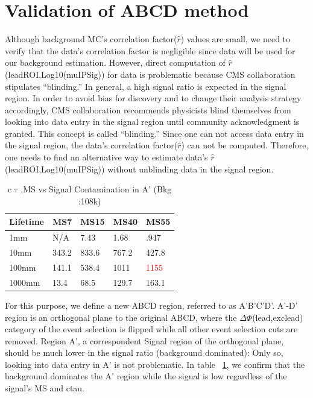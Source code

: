 \section{Validation of ABCD method}
Although background MC's correlation factor($\hat{r}$) values are small, we need to verify that the data's correlation factor is negligible since data will be used for our background estimation.
However, direct computation of $\hat{r}$(leadROI,Log10(muIPSig)) for data is problematic because CMS collaboration stipulates ``blinding.''
In general, a high signal ratio is expected in the signal region.
In order to avoid bias for discovery and to change their analysis strategy accordingly, CMS collaboration recommends physicists blind themselves from looking into data entry in the signal region until community acknowledgment is granted.
This concept is called ``blinding.''
Since one can not access data entry in the signal region, the data's correlation factor($\hat{r}$) can not be computed.
Therefore, one needs to find an alternative way to estimate data's $\hat{r}$(leadROI,Log10(muIPSig)) without unblinding data in the signal region.

\begin{table}[htb]
\centering
\begin{tabular}{|p{3cm}|p{1cm}|p{1cm}|p{1cm}|p{1cm}|}
\hline
Lifetime & MS7 & MS15&MS40&MS55 \\
\hline
1mm & N/A & 7.43 & 1.68 & .947   \\
\hline
10mm & 343.2 & 833.6 & 767.2 & 427.8  \\
\hline
100mm & 141.1& 538.4 & 1011 & \textcolor{red}{1155} \\
\hline
1000mm & 13.4 & 68.5 & 129.7  &  163.1  \\
\hline
\end{tabular}
\label{tab:sigcont}
\centering
\caption{c$\uptau$,MS vs Signal Contamination in A' (Bkg :108k)}
\end{table}
For this purpose, we define a new ABCD region, referred to as A'B'C'D'.
A'-D' region is an orthogonal plane to the original ABCD, where the $\Delta\Phi$(lead,exclead) category of the event selection is flipped while all other event selection cuts are removed.
Region A', a correspondent Signal region of the orthogonal plane, should be much lower in the signal ratio (background dominated): Only so, looking into data entry in A' is not problematic.
In table ~\ref{tab:sigcont}, we confirm that the background dominates the A' region while the signal is low regardless of the signal's MS and ctau.




